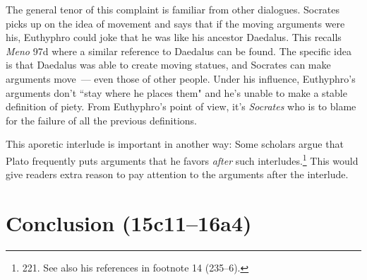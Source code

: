 \documentclass[11pt]{article}
\begin{document}
The general tenor of this complaint is familiar from other dialogues.
Socrates picks up on the idea of movement and says that if the moving
arguments were his, Euthyphro could joke that he was like his ancestor
Daedalus.  This recalls \emph{Meno} 97d where a similar reference to
Daedalus can be found.  The specific idea is that Daedalus was able to
create moving statues, and Socrates can make arguments move~--- even those
of other people.  Under his influence, Euthyphro's arguments don't ``stay
where he places them" and he's unable to make a stable definition of piety.
From Euthyphro's point of view, it's \emph{Socrates} who is to blame for
the failure of all the previous definitions.

This aporetic interlude is important in another way: Some scholars argue
that Plato frequently puts arguments that he favors \emph{after} such
interludes.\footnote{\citet{mcpherran1992} 221.  See also his references
in footnote 14 (235--6).}  This would give readers extra reason to pay
attention to the arguments after the interlude.

\section{Conclusion (15c11--16a4)}



\end{document}
